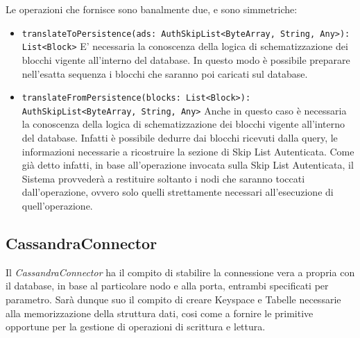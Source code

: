 		Le operazioni che fornisce sono banalmente due, e sono simmetriche:
		\begin{itemize}
			\item \verb!translateToPersistence(ads: AuthSkipList<ByteArray, String, Any>): List<Block>! E' necessaria la conoscenza della logica di schematizzazione dei blocchi vigente all'interno del database. In questo modo è possibile preparare nell'esatta sequenza i blocchi che saranno poi caricati sul database.
			\item \verb!translateFromPersistence(blocks: List<Block>): AuthSkipList<ByteArray, String, Any>! Anche in questo caso è necessaria la conoscenza della logica di schematizzazione dei blocchi vigente all'interno del database. Infatti è possibile dedurre dai blocchi ricevuti dalla query, le informazioni necessarie a ricostruire la sezione di Skip List Autenticata. Come già detto infatti, in base all'operazione invocata sulla Skip List Autenticata, il Sistema provvederà a restituire soltanto i nodi che saranno toccati dall'operazione, ovvero solo quelli strettamente necessari all'esecuzione di quell'operazione.
		\end{itemize}
		
	\subsection{CassandraConnector}
	

		Il \textit{CassandraConnector} ha il compito di stabilire la connessione vera a propria con il database, in base al particolare nodo e alla porta, entrambi specificati per parametro. Sarà dunque suo il compito di creare Keyspace e Tabelle necessarie alla memorizzazione della struttura dati, cosi come a fornire le primitive opportune per la gestione di operazioni di scrittura e lettura.
		
